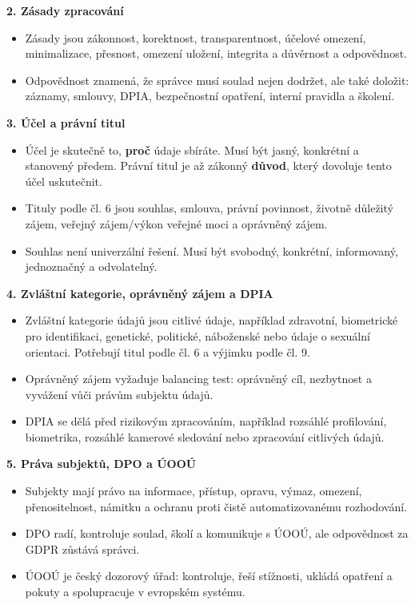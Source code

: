 \documentclass[11pt,a4paper]{article}
\begin{document}
\textbf{2. Zásady zpracování}
\begin{itemize}
  \item Zásady jsou zákonnost, korektnost, transparentnost, účelové omezení, minimalizace, přesnost, omezení uložení, integrita a důvěrnost a odpovědnost.
  \item Odpovědnost znamená, že správce musí soulad nejen dodržet, ale také doložit: záznamy, smlouvy, DPIA, bezpečnostní opatření, interní pravidla a školení.
\end{itemize}

\textbf{3. Účel a právní titul}
\begin{itemize}
  \item Účel je skutečně to, \textbf{proč} údaje sbíráte. Musí být jasný, konkrétní a stanovený předem. Právní titul je až zákonný \textbf{důvod}, který dovoluje tento účel uskutečnit.
  \item Tituly podle čl. 6 jsou souhlas, smlouva, právní povinnost, životně důležitý zájem, veřejný zájem/výkon veřejné moci a oprávněný zájem.
  \item Souhlas není univerzální řešení. Musí být svobodný, konkrétní, informovaný, jednoznačný a odvolatelný.
\end{itemize}

\textbf{4. Zvláštní kategorie, oprávněný zájem a DPIA}
\begin{itemize}
  \item Zvláštní kategorie údajů jsou citlivé údaje, například zdravotní, biometrické pro identifikaci, genetické, politické, náboženské nebo údaje o sexuální orientaci. Potřebují titul podle čl. 6 a výjimku podle čl. 9.
  \item Oprávněný zájem vyžaduje balancing test: oprávněný cíl, nezbytnost a vyvážení vůči právům subjektu údajů.
  \item DPIA se dělá před rizikovým zpracováním, například rozsáhlé profilování, biometrika, rozsáhlé kamerové sledování nebo zpracování citlivých údajů.
\end{itemize}

\textbf{5. Práva subjektů, DPO a ÚOOÚ}
\begin{itemize}
  \item Subjekty mají právo na informace, přístup, opravu, výmaz, omezení, přenositelnost, námitku a ochranu proti čistě automatizovanému rozhodování.
  \item DPO radí, kontroluje soulad, školí a komunikuje s ÚOOÚ, ale odpovědnost za GDPR zůstává správci.
  \item ÚOOÚ je český dozorový úřad: kontroluje, řeší stížnosti, ukládá opatření a pokuty a spolupracuje v evropském systému.
\end{itemize}
\end{document}
